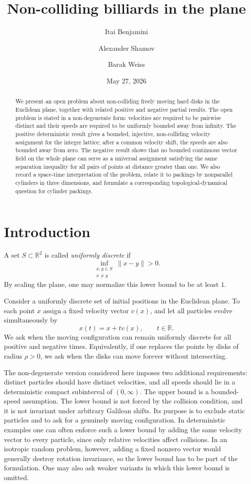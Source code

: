 \documentclass[11pt]{article}
\title{Non-colliding billiards in the plane}
\author{Itai Benjamini \and Alexander Shamov \and Barak Weiss}
\date{May 27, 2026}
\theoremstyle{remark}
\begin{document}
\maketitle

\begin{abstract}
We present an open problem about non-colliding freely moving hard disks in the Euclidean plane, together with related positive and negative partial results. The open problem is stated in a non-degenerate form: velocities are required to be pairwise distinct and their speeds are required to be uniformly bounded away from infinity. The positive deterministic result gives a bounded, injective, non-colliding velocity assignment for the integer lattice; after a common velocity shift, the speeds are also bounded away from zero. The negative result shows that no bounded continuous vector field on the whole plane can serve as a universal assignment satisfying the same separation inequality for all pairs of points at distance greater than one. We also record a space-time interpretation of the problem, relate it to packings by nonparallel cylinders in three dimensions, and formulate a corresponding topological-dynamical question for cylinder packings.
\end{abstract}

\section{Introduction}

A set $S \subset \mathbb R^2$ is called \emph{uniformly discrete} if
\[
\inf_{\substack{x,y\in S\\ x\ne y}} \|x-y\| >0 .
\]
By scaling the plane, one may normalize this lower bound to be at least $1$.

Consider a uniformly discrete set of initial positions in the Euclidean plane. To each point $x$ assign a fixed velocity vector $v(x)$, and let all particles evolve simultaneously by
\[
x(t)=x+t v(x), \qquad t\in \mathbb R .
\]
We ask when the moving configuration can remain uniformly discrete for all positive and negative times. Equivalently, if one replaces the points by disks of radius $\rho>0$, we ask when the disks can move forever without intersecting.

The non-degenerate version considered here imposes two additional requirements: distinct particles should have distinct velocities, and all speeds should lie in a deterministic compact subinterval of $(0,\infty)$. The upper bound is a bounded-speed assumption. The lower bound is not forced by the collision condition, and it is not invariant under arbitrary Galilean shifts. Its purpose is to exclude static particles and to ask for a genuinely moving configuration. In deterministic examples one can often enforce such a lower bound by adding the same velocity vector to every particle, since only relative velocities affect collisions. In an isotropic random problem, however, adding a fixed nonzero vector would generally destroy rotation invariance, so the lower bound has to be part of the formulation. One may also ask weaker variants in which this lower bound is omitted.
\end{document}
